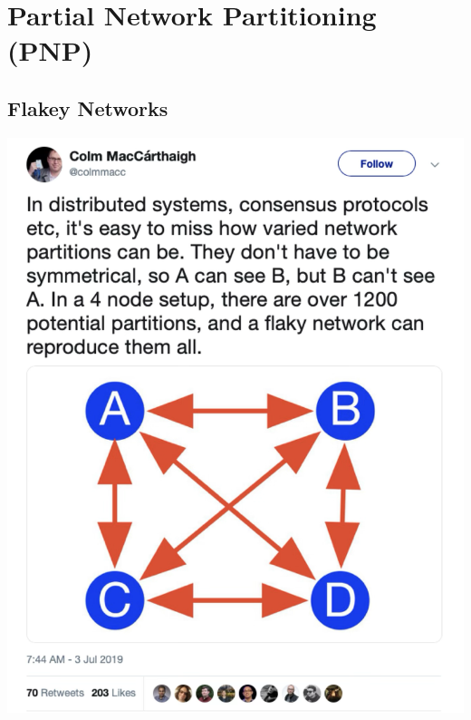 \documentclass[HFT-main.tex]{subfiles}
\begin{document}
\clearpage
\section{Partial Network Partitioning (PNP)}
\subsection{Flakey Networks}

\begin{marginfigure}
\href{https://x.com/colmmacc/status/1146429508993503234?s=61}{\includegraphics[width=\linewidth]{../figures/Flakey-Network.png}}
\end{marginfigure}

\end{document}

